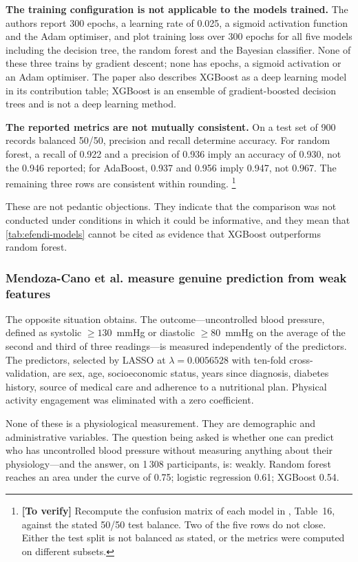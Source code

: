 \documentclass[12pt,a4paper,oneside]{report}
\newcommand{\verify}[1]{\footnote{\textbf{[To verify]} #1}}
\begin{document}
\textbf{The training configuration is not applicable to the models trained.} The authors report 300 epochs, a learning rate of 0.025, a sigmoid activation function and the Adam optimiser, and plot training loss over 300 epochs for all five models including the decision tree, the random forest and the Bayesian classifier. None of these three trains by gradient descent; none has epochs, a sigmoid activation or an Adam optimiser. The paper also describes XGBoost as a deep learning model in its contribution table; XGBoost is an ensemble of gradient-boosted decision trees and is not a deep learning method.

\textbf{The reported metrics are not mutually consistent.} On a test set of 900 records balanced 50/50, precision and recall determine accuracy. For random forest, a recall of 0.922 and a precision of 0.936 imply an accuracy of 0.930, not the 0.946 reported; for AdaBoost, 0.937 and 0.956 imply 0.947, not 0.967. The remaining three rows are consistent within rounding.%
\verify{Recompute the confusion matrix of each model in \textcite{efendi2025}, Table~16, against the stated 50/50 test balance. Two of the five rows do not close. Either the test split is not balanced as stated, or the metrics were computed on different subsets.}

These are not pedantic objections. They indicate that the comparison was not conducted under conditions in which it could be informative, and they mean that \cref{tab:efendi-models} cannot be cited as evidence that XGBoost outperforms random forest.

\subsubsection{Mendoza-Cano et al. measure genuine prediction from weak features}

The opposite situation obtains. The outcome---uncontrolled blood pressure, defined as systolic $\geq 130$~mmHg or diastolic $\geq 80$~mmHg on the average of the second and third of three readings---is measured independently of the predictors. The predictors, selected by LASSO at $\lambda = 0.0056528$ with ten-fold cross-validation, are sex, age, socioeconomic status, years since diagnosis, diabetes history, source of medical care and adherence to a nutritional plan. Physical activity engagement was eliminated with a zero coefficient.

None of these is a physiological measurement. They are demographic and administrative variables. The question being asked is whether one can predict who has uncontrolled blood pressure without measuring anything about their physiology---and the answer, on 1\,308 participants, is: weakly. Random forest reaches an area under the curve of 0.75; logistic regression 0.61; XGBoost 0.54.
\end{document}
